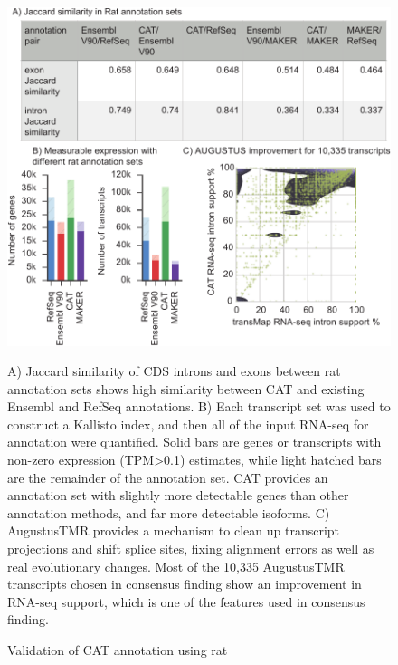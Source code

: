 \documentclass[fleqn,10pt]{wlscirep}
\begin{document}
\begin{figure}
\centering
\includegraphics[width=\textwidth,height=\textheight,keepaspectratio]{figure5-rat_v18.pdf}
\caption{Validation of CAT annotation using rat}
A) Jaccard similarity of CDS introns and exons between rat annotation sets shows high similarity between CAT and existing Ensembl and RefSeq annotations. B) Each transcript set was used to construct a Kallisto \cite{bray2015near} index, and then all of the input RNA-seq for annotation were quantified. Solid bars are genes or transcripts with non-zero expression (TPM\textgreater 0.1) estimates, while light hatched bars are the remainder of the annotation set. CAT provides an annotation set with slightly more detectable genes than other annotation methods, and far more detectable isoforms. C) AugustusTMR provides a mechanism to clean up transcript projections and shift splice sites, fixing alignment errors as well as real evolutionary changes. Most of the 10,335 AugustusTMR transcripts chosen in consensus finding show an improvement in RNA-seq support, which is one of the features used in consensus finding.
\label{fig:rat_validation}
\end{figure}
\end{document}
